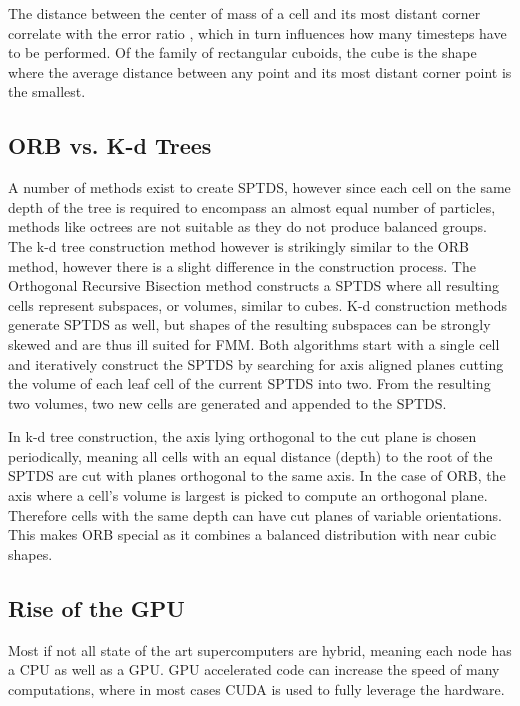 \documentclass[]{article}
\begin{document}
The distance between the center of mass of a cell and its most distant corner correlate with the error ratio \cite{Stadel2001}, which in turn influences how many timesteps have to be performed. Of the family of rectangular cuboids, the cube is the shape where the average distance between any point and its most distant corner point is the smallest. 

\subsection{ORB vs. K-d Trees}

A number of methods exist to create SPTDS, however since each cell on the same depth of the tree is required to encompass an almost equal number of particles, methods like octrees are not suitable as they do not produce balanced groups. The k-d tree construction method however is strikingly similar to the ORB method, however there is a slight difference in the construction process. 
The Orthogonal Recursive Bisection method constructs a SPTDS where all resulting cells represent subspaces, or volumes, similar to cubes. K-d construction methods generate SPTDS as well, but shapes of the resulting subspaces can be strongly skewed and are thus ill suited for FMM. Both algorithms start with a single cell and iteratively construct the SPTDS by searching for axis aligned planes cutting the volume of each leaf cell of the current SPTDS into two. From the resulting two volumes, two new cells are generated and appended to the SPTDS. 

In k-d tree construction, the axis lying orthogonal to the cut plane is chosen periodically, meaning all cells with an equal distance (depth) to the root of the SPTDS are cut with planes orthogonal to the same axis. In the case of ORB, the axis where a cell's volume is largest is picked to compute an orthogonal plane. Therefore cells with the same depth can have cut planes of variable orientations. This makes ORB special as it combines a balanced distribution with near cubic shapes.  

\subsection{Rise of the GPU}

Most if not all state of the art supercomputers are hybrid, meaning each node has a CPU as well as a GPU\cite{TOP500}. GPU accelerated code can increase the speed of many computations, where in most cases CUDA is used to fully leverage the hardware. 
\end{document}
